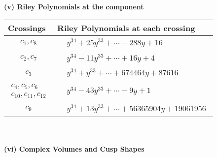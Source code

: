 \documentclass[1p]{elsarticle_modified}
\theoremstyle{definition}
\begin{document}
\newpage\renewcommand{\arraystretch}{1}
\flushleft \textbf{(v) Riley Polynomials at the component}\newline \\
\begin{tabular}{m{50pt}|m{274pt}}
Crossings & \hspace{64pt}Riley Polynomials at each crossing \\
\hline $$\begin{aligned}c_{1},c_{8}\end{aligned}$$&$\begin{aligned}
&y^{34}+25 y^{33}+\cdots-288 y+16
\end{aligned}$\\
\hline $$\begin{aligned}c_{2},c_{7}\end{aligned}$$&$\begin{aligned}
&y^{34}-11 y^{33}+\cdots+16 y+4
\end{aligned}$\\
\hline $$\begin{aligned}c_{3}\end{aligned}$$&$\begin{aligned}
&y^{34}+y^{33}+\cdots+674464 y+87616
\end{aligned}$\\
\hline $$\begin{aligned}c_{4},c_{5},c_{6}\\c_{10},c_{11},c_{12}\end{aligned}$$&$\begin{aligned}
&y^{34}-43 y^{33}+\cdots-9 y+1
\end{aligned}$\\
\hline $$\begin{aligned}c_{9}\end{aligned}$$&$\begin{aligned}
&y^{34}+13 y^{33}+\cdots+56365904 y+19061956
\end{aligned}$\\
\hline
\end{tabular}\\~\\
\newpage\flushleft \textbf{(vi) Complex Volumes and Cusp Shapes}
\end{document}
